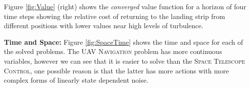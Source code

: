 Figure \ref{fig:Value} (right) shows the \emph{converged} value
function for a horizon of four time steps showing the 
relative cost of returning to the landing strip from different
positions with lower values near high levels of turbulence.

\textbf{Time and Space:} Figure \ref{fig:SpaceTime} shows the time and
space for each of the solved problems.  The \textsc{UAV Navigation}
problem has more continuous variables, however we can see that it is
easier to solve than the \textsc{Space Telescope Control}, one
possible reason is that the latter has more actions with more
complex forms of linearly state dependent noise.
